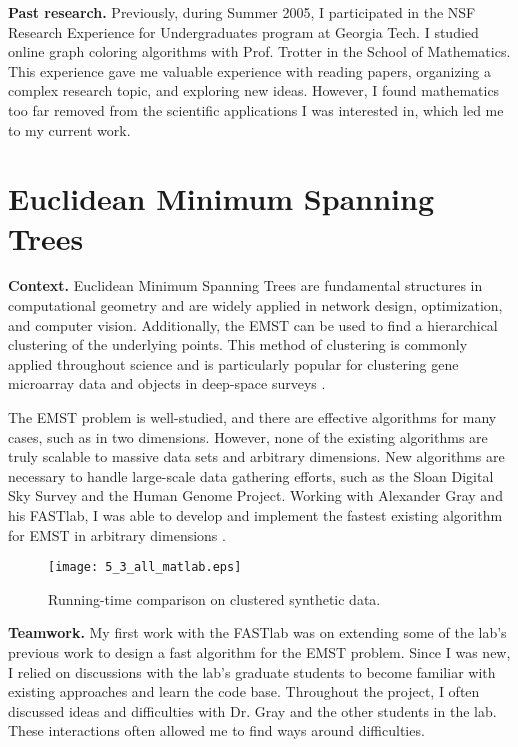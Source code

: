 \documentclass[twoside,leqno, 12pt]{article}
\begin{document}
\textbf{Past research.}  Previously, during Summer 2005, I participated in the NSF Research Experience for Undergraduates program at Georgia Tech.  I studied online graph coloring algorithms with Prof. Trotter in the School of Mathematics.  This experience gave me valuable experience with reading papers, organizing a complex research topic, and exploring new ideas.  However, I found mathematics too far removed from the scientific applications I was interested in, which led me to my current work.


\vspace{-0.1in}
\section{Euclidean Minimum Spanning Trees}

\textbf{Context.}  Euclidean Minimum Spanning Trees are fundamental structures in computational geometry and are widely applied in network design, optimization, and computer vision.  Additionally, the EMST can be used to find a hierarchical clustering of the underlying points.  This method of clustering is commonly applied throughout science and is particularly popular for clustering gene microarray data \cite{eisen_cluster} and objects in deep-space surveys \cite{barrow}.  

The EMST problem is well-studied, and there are effective algorithms for many cases, such as in two dimensions.  However, none of the existing algorithms are truly scalable to massive data sets and arbitrary dimensions.  New algorithms are necessary to handle large-scale data gathering efforts, such as the Sloan Digital Sky Survey and the Human Genome Project.  Working with Alexander Gray and his FASTlab, I was able to develop and implement the fastest existing algorithm for EMST in arbitrary dimensions \cite{my_emst}.
\begin{wrapfigure}{r}{0.45\textwidth}
\vspace{-0.2in}
\texttt{[image: 5\_3\_all\_matlab.eps]}
\vspace{-0.3in}
\caption{Running-time comparison on clustered synthetic data.}
\label{runtime}
\end{wrapfigure}


\vspace{-0.18in}
\textbf{Teamwork.}  My first work with the FASTlab was on extending some of the lab's previous work to design a fast algorithm for the EMST problem.  Since I was new, I relied on discussions with the lab's graduate students to become familiar with existing approaches and learn the code base.  Throughout the project, I often discussed ideas and difficulties with Dr. Gray and the other students in the lab.  These interactions often allowed me to find ways around difficulties.
\end{document}
